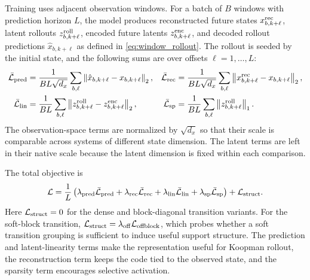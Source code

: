 \documentclass[11pt]{article}
\newcommand{\norm}[1]{\left\lVert #1 \right\rVert}
\theoremstyle{plain}
\theoremstyle{definition}
\begin{document}
Training uses adjacent observation windows. For a batch of $B$ windows with prediction horizon $L$, the model produces reconstructed future states $x_{b,k+\ell}^{\rm rec}$, latent rollouts $z_{b,k+\ell}^{\rm roll}$, encoded future latents $z_{b,k+\ell}^{\rm enc}$, and decoded rollout predictions $\hat x_{b,k+\ell}$ as defined in \cref{eq:window_rollout}. The rollout is seeded by the initial state, and the following sums are over offsets $\ell=1,\ldots,L$:
\begin{align}
  \bar{\mathcal{L}}_{\rm pred}
  &=\frac{1}{BL\sqrt{d_x}}\sum_{b,\ell}\norm{\hat{x}_{b,k+\ell}-x_{b,k+\ell}}_2,
  &
  \bar{\mathcal{L}}_{\rm rec}
  &=\frac{1}{BL\sqrt{d_x}}\sum_{b,\ell}\norm{x_{b,k+\ell}^{\rm rec}-x_{b,k+\ell}}_2,
  \label{eq:loss_state_terms}
  \\
  \bar{\mathcal{L}}_{\rm lin}
  &=\frac{1}{BL}\sum_{b,\ell}\norm{z_{b,k+\ell}^{\rm roll}-z_{b,k+\ell}^{\rm enc}}_2,
  &
  \bar{\mathcal{L}}_{\rm sp}
  &=\frac{1}{BL}\sum_{b,\ell}\norm{z_{b,k+\ell}^{\rm roll}}_1 .
  \label{eq:loss_latent_terms}
\end{align}
The observation-space terms are normalized by $\sqrt{d_x}$ so that their scale is comparable across systems of different state dimension. The latent terms are left in their native scale because the latent dimension is fixed within each comparison.

The total objective is
\begin{equation}
  \mathcal{L}
  =
  \frac{1}{L}\left(
  \lambda_{\rm pred}\bar{\mathcal{L}}_{\rm pred}
  +\lambda_{\rm rec}\bar{\mathcal{L}}_{\rm rec}
  +\lambda_{\rm lin}\bar{\mathcal{L}}_{\rm lin}
  +\lambda_{\rm sp}\bar{\mathcal{L}}_{\rm sp}
  \right)
  +\mathcal{L}_{\rm struct}.
  \label{eq:training_objective}
\end{equation}
Here $\mathcal{L}_{\rm struct}=0$ for the dense and block-diagonal transition variants.
For the soft-block transition, $\mathcal{L}_{\rm struct}=\lambda_{\rm off}\mathcal{L}_{\rm offblock}$, which probes whether a soft transition grouping is sufficient to induce useful support structure.
The prediction and latent-linearity terms make the representation useful for Koopman rollout, the reconstruction term keeps the code tied to the observed state, and the sparsity term encourages selective activation.

\end{document}
